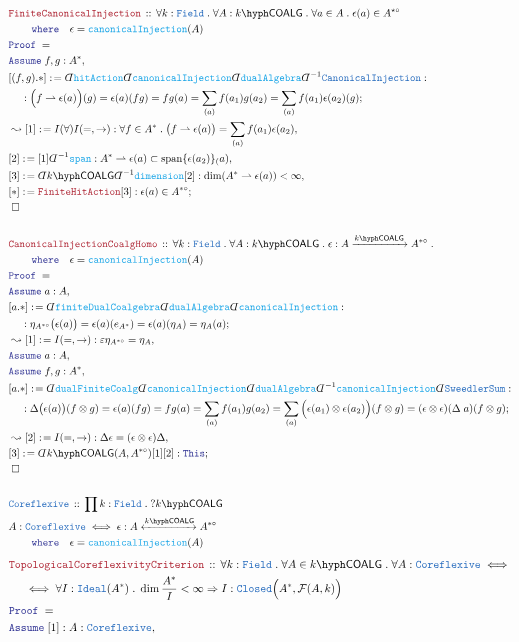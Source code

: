 \documentclass[12pt]{scrartcl}%
\newcommand{\TYPE}[1]{\textcolor{NavyBlue}{\mathtt{#1}}}%
\newcommand{\FUNC}[1]{\textcolor{Cerulean}{\mathtt{#1}}}%
\newcommand{\LOGIC}[1]{\textcolor{Blue}{\mathtt{#1}}}%
\newcommand{\THM}[1]{\textcolor{Maroon}{\mathtt{#1}}}%
\renewcommand{\.}{\; . \;} %
\newcommand{\de}{: \kern 0.1pc =} %
\newcommand{\where}{\LOGIC{where}} %
\newcommand{\Theorem}[2]{& \THM{#1} \, :: \, #2 \\ & \Proof = \\ } %
\newcommand{\DeclareType}[2]{& \TYPE{#1} \, :: \, #2 \\}%
\newcommand{\DefineType}[3]{& #1 : \TYPE{#2} \iff #3 \\}%
\newcommand{\NewLine}{\\ & \kern 1pc}%
\newcommand{\Page}[1]{ \begin{align*} #1 \end{align*}  }%
\newcommand{ \bd }{ \ByDef }%
\newcommand{\Say}[3]{& #1 \de #2 : #3, \\} %
\newcommand{\Conclude}[3]{& #1 \de #2 : #3; \\}%
\newcommand{\Derive}[3]{& \leadsto #1 \de #2 : #3, \\} %
\newcommand{\Assume}[2]{& \LOGIC{Assume} \; #1 : #2, \\} %
\newcommand{\QED}{\; \square} %
\newcommand{\EndProof}{& \QED \\} %
\newcommand{\ByDef}{\rotatebox[origin=c]{-180}{$D$}}%
\newcommand{\Proof}{\LOGIC{Proof} \; } %
\newcommand{\Arrow}[1]{\xrightarrow{#1}}%
\newcommand{\ToIso}[1]{\xleftrightarrow{#1}}%
\DeclareMathOperator{\Span}{span} %
\newcommand{\Field}{\TYPE{Field}}
\newcommand{\Ideal}{\TYPE{Ideal}}
\newcommand{\F}{\mathcal{F}}
\newcommand{\COALG}[1]{#1\hyph\mathsf{COALG}}%
\newcommand{\hit}{\rightharpoonup}
\begin{document}
\Page{
	\Theorem{FiniteCanonicalInjection}{\forall k : \Field \. \forall A : \COALG{k} \. \forall a \in A \. \epsilon(a) \in A^{\star\circ} 
		\NewLine \quad \where \quad \epsilon = \FUNC{canonicalInjection}(A)}
	\Assume{f,g }{A^*}
	\Conclude{[(f,g).*]}{\bd \FUNC{hitAction} \bd \FUNC{canonicalInjection}\bd \FUNC{dualAlgebra}\bd^{-1} \TYPE{CanonicalInjection}}{  
		\NewLine :
		\Big(f \hit \epsilon(a)\Big)(g) = 
		\epsilon(a)(fg) = 
		fg(a) = 
		\sum_{(a)} f(a_1)g(a_2) = 
		\sum_{(a)} f(a_1) \epsilon(a_2)(g)   
	}
	\Derive{[1]}{I(\forall)I(=,\to)}{\forall f \in A^* \.  \big(f \hit \epsilon(a)\big) = \sum_{(a)}  f(a_1)\epsilon(a_2)    } 
	\Say{[2]}{[1]\bd^{-1}\FUNC{span}}{ A^* \hit \epsilon(a) \subset \Span \{ \epsilon(a_2)   \}_(a) }
	\Say{[3]}{\bd \COALG{k}\bd^{-1} \FUNC{dimension}[2]}{\dim (A^* \hit \epsilon(a)) < \infty}
	\Conclude{[*]}{\THM{FiniteHitAction}[3]}{\epsilon(a) \in A^{*\circ}} \EndProof 
	\\ 	
	\Theorem{CanonicalInjectionCoalgHomo}{ \forall k : \Field \. \forall A : \COALG{k} \.  \epsilon : A \Arrow{\COALG{k}} A^{*\circ} \.  \NewLine \quad \where \quad \epsilon = \FUNC{canonicalInjection}(A) } 
	\Assume{a}{A} 
	\Conclude{[a.*]}{\bd  \FUNC{finiteDualCoalgebra} \bd \FUNC{dualAlgebra} \bd \FUNC{canonicalInjection} }{  \NewLine : \eta_{A^{*\circ}}\big(\epsilon(a)\big) = \epsilon(a)(e_{A^*}) = \epsilon(a)(\eta_A) = \eta_A(a) } 
	\Derive{[1]}{I(=,\to) }{\varepsilon \eta_{A^{*\circ}} = \eta_A} \Assume{a}{A} \Assume{f,g}{A^*} 
	\Conclude{[a.*]}{\bd \FUNC{dualFiniteCoalg} \bd \FUNC{canonicalInjection}\bd \FUNC{dualAlgebra} \bd^{-1} \FUNC{canonicalInjection} \bd \TYPE{SweedlerSum}  } 
	{ \NewLine : \Delta\big(\epsilon(a)\big)(f \otimes g) = \epsilon(a)(fg) = fg(a) = \sum_{(a)} f(a_1)g(a_2) = \sum_{(a)}  \Big(\epsilon(a_1) \otimes \epsilon(a_2)\Big)( f \otimes g  ) = (\epsilon \otimes \epsilon)(\Delta\;a)(f \otimes g)  } 
	\Derive{[2]}{I(=,\to)}{  \Delta \epsilon = (\epsilon \otimes \epsilon)\Delta   } 
	\Conclude{[3]}{\bd \COALG{k}(A,A^{*\circ})[1][2] }{  \LOGIC{This}   } 
	\EndProof 
	\\ 
	\DeclareType{Coreflexive}{\prod k : \Field \. ?\COALG{k}} 
	\DefineType{A}{Coreflexive}{ \epsilon : A \ToIso{\COALG{k}} A^{*\circ} \NewLine \quad \where \quad \epsilon = \FUNC{canonicalInjection}(A) } 
}\Page{ 
	\Theorem{TopologicalCoreflexivityCriterion}
	{ \forall k : \Field \.  \forall A \in \COALG{k} \.  \forall A : \TYPE{Coreflexive} \iff 
		\NewLine  
		\iff \forall I : \Ideal(A^*) \.  \dim \frac{A^*}{I} < \infty \Rightarrow I : \TYPE{Closed}\Big(A^*,\F(A,k)\Big) } 
	\Assume{[1]}{A : \TYPE{Coreflexive}} 
}
\end{document}
